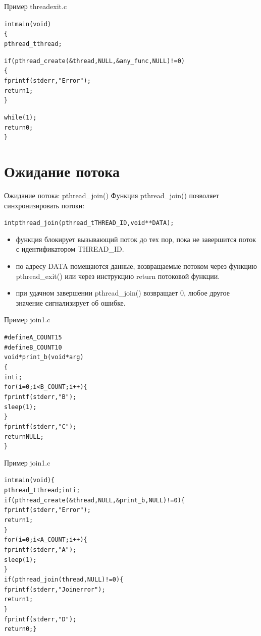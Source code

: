 \documentclass{beamer}
\begin{document}
\begin{frame}[fragile]{Пример threadexit.c}
\begin{alltt}
int main (void)
\{
    pthread_t thread;

    if (pthread_create (&thread, NULL, &any_func, NULL) != 0) 
    \{
        fprintf (stderr, "Error");
        return 1;
    \}

    while (1);
    return 0;
\}
\end{alltt}
\end{frame}

\section{Ожидание потока}
\begin{frame}[fragile]{Ожидание потока: pthread\_join()}
Функция pthread\_join() позволяет синхронизировать потоки:
\begin{alltt}
int pthread_join (pthread_t THREAD_ID, void ** DATA);
\end{alltt}
\begin{itemize}
\item функция блокирует вызывающий поток до тех пор, пока не завершится поток с идентификатором THREAD\_ID. 
\item по адресу DATA помещаются данные, возвращаемые потоком через функцию pthread\_exit() или через инструкцию return потоковой функции.
\item при удачном завершении pthread\_join() возвращает 0, любое другое значение сигнализирует об ошибке.
\end{itemize}
\end{frame}

\begin{frame}[fragile]{Пример join1.c}
\begin{alltt}
#define A_COUNT 15
#define B_COUNT 10
void * print_b (void * arg)
\{
  int i;
  for (i = 0; i < B_COUNT; i++) \{
    fprintf (stderr, "B");
    sleep (1);
  \}
  fprintf (stderr, "C");
  return NULL;
\}
\end{alltt}
\end{frame}

\begin{frame}[fragile]{Пример join1.c}
\begin{alltt}
int main (void)\{
    pthread_t thread; int i;
    if (pthread_create (&thread, NULL, &print_b, NULL) != 0) \{
      fprintf (stderr, "Error");
      return 1;
    \}
    for (i = 0; i < A_COUNT; i++) \{
      fprintf (stderr, "A");
      sleep (1);
    \}
    if (pthread_join (thread, NULL) != 0) \{
      fprintf (stderr, "Join error");
      return 1;
    \}
    fprintf (stderr, "D");
    return 0; \}
\end{alltt}
\end{frame}
\end{document}
